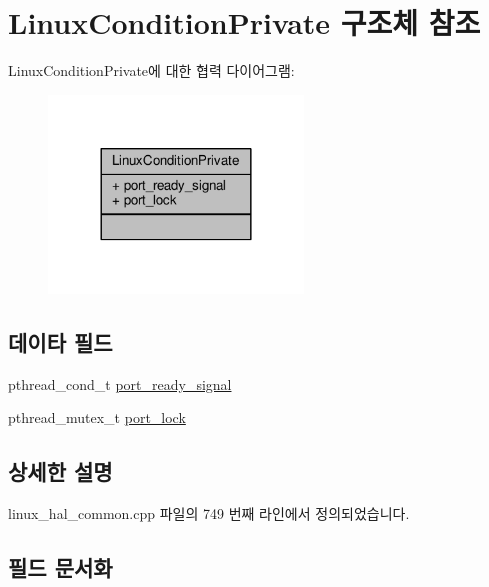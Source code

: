 \hypertarget{struct_linux_condition_private}{}\section{Linux\+Condition\+Private 구조체 참조}
\label{struct_linux_condition_private}


Linux\+Condition\+Private에 대한 협력 다이어그램\+:
\nopagebreak
\begin{figure}[H]
\begin{center}
\leavevmode
\includegraphics[width=192pt]{struct_linux_condition_private__coll__graph}
\end{center}
\end{figure}
\subsection*{데이타 필드}
\begin{DoxyCompactItemize}
\item 
pthread\+\_\+cond\+\_\+t \hyperlink{struct_linux_condition_private_a661b628f98aeac53e3761d30a8201add}{port\+\_\+ready\+\_\+signal}
\item 
pthread\+\_\+mutex\+\_\+t \hyperlink{struct_linux_condition_private_a487bd691e1e2e31c958ff8a1fbc72c9e}{port\+\_\+lock}
\end{DoxyCompactItemize}


\subsection{상세한 설명}


linux\+\_\+hal\+\_\+common.\+cpp 파일의 749 번째 라인에서 정의되었습니다.



\subsection{필드 문서화}
